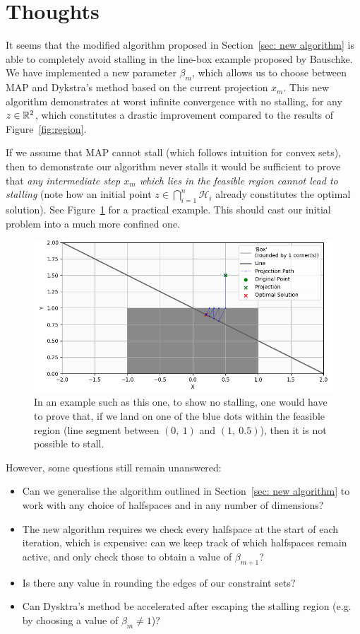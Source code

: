 \documentclass[hidelinks]{article}
\begin{document}
\section{Thoughts}
%
It seems that the modified algorithm proposed in Section~\ref{sec: new algorithm} is able to completely avoid stalling in the line-box example proposed by Bauschke. We have implemented a new parameter $\beta_m$, which allows us to choose between MAP and Dykstra's method based on the current projection $x_m$. This new algorithm demonstrates at worst infinite convergence with no stalling, for any $z \in \mathbb{R}^{2}$, which constitutes a drastic improvement compared to the results of Figure~\ref{fig:region}.
\par If we assume that MAP cannot stall (which follows intuition for convex sets), then to demonstrate our algorithm never stalls it would be sufficient to prove that \emph{any intermediate step $x_m$ which lies in the feasible region cannot lead to stalling} (note how an initial point $z \in \bigcap_{i=1}^n \mathcal{H}_i$ already constitutes the optimal solution). See Figure~\ref{fig:intermediates} for a practical example. This should cast our initial problem into a much more confined one.
%
\begin{figure}[h!]
    \centering
    
    \includegraphics[width=1\textwidth]{intermediate_steps.png}
    \caption{In an example such as this one, to show no stalling, one would have to prove that, if we land on one of the blue dots within the feasible region (line segment between $(0,~1)$ and $(1,~0.5)$), then it is not possible to stall.}
    \label{fig:intermediates}

\end{figure}
%
\par However, some questions still remain unanswered:
\begin{itemize}
\item Can we generalise the algorithm outlined in Section~\ref{sec: new algorithm} to work with any choice of halfspaces and in any number of dimensions?
\item The new algorithm requires we check every halfspace at the start of each iteration, which is expensive: can we keep track of which halfspaces remain active, and only check those to obtain a value of $\beta_{m+1}$?
\item Is there any value in rounding the edges of our constraint sets?
\item Can Dysktra's method be accelerated after escaping the stalling region (e.g. by choosing a value of $\beta_m \neq 1$)?
\end{itemize}
%
\newpage


%
\end{document}
